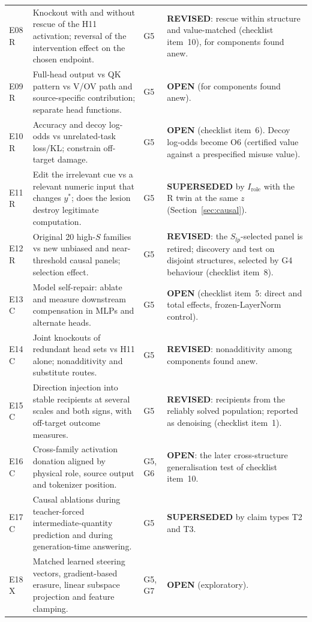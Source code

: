 \documentclass[10pt,a4paper]{article}
\begin{document}
\begin{longtable}{@{}P{1.2cm}P{7.2cm}P{1.3cm}P{5.6cm}@{}}
E08 \newline R & Knockout with and without rescue of the H11 activation; reversal of the intervention effect on the chosen endpoint. & G5 &
\textbf{REVISED}: rescue within structure and value-matched (checklist item~10), for components found anew. \\
E09 \newline R & Full-head output vs QK pattern vs V/OV path and source-specific contribution; separate head functions. & G5 &
\textbf{OPEN} (for components found anew). \\
E10 \newline R & Accuracy and decoy log-odds vs unrelated-task loss/KL; constrain off-target damage. & G5 &
\textbf{OPEN} (checklist item~6). Decoy log-odds become O6 (certified value against a prespecified misuse value). \\
E11 \newline R & Edit the irrelevant cue vs a relevant numeric input that changes $y^*$; does the lesion destroy legitimate computation. & G5 &
\textbf{SUPERSEDED} by $I_{\text{role}}$ with the R twin at the same $z$ (Section~\ref{sec:causal}). \\
E12 \newline R & Original 20 high-$S$ families vs new unbiased and near-threshold causal panels; selection effect. & G5 &
\textbf{REVISED}: the $S_{lp}$-selected panel is retired; discovery and test on disjoint structures, selected by G4 behaviour (checklist item~8). \\
E13 \newline C & Model self-repair: ablate and measure downstream compensation in MLPs and alternate heads. & G5 &
\textbf{OPEN} (checklist item~5: direct and total effects, frozen-LayerNorm control). \\
E14 \newline C & Joint knockouts of redundant head sets vs H11 alone; nonadditivity and substitute routes. & G5 &
\textbf{REVISED}: nonadditivity among components found anew. \\
E15 \newline C & Direction injection into stable recipients at several scales and both signs, with off-target outcome measures. & G5 &
\textbf{REVISED}: recipients from the reliably solved population; reported as denoising (checklist item~1). \\
E16 \newline C & Cross-family activation donation aligned by physical role, source output and tokenizer position. & G5, G6 &
\textbf{OPEN}: the later cross-structure generalisation test of checklist item~10. \\
E17 \newline C & Causal ablations during teacher-forced intermediate-quantity prediction and during generation-time answering. & G5 &
\textbf{SUPERSEDED} by claim types T2 and T3. \\
E18 \newline X & Matched learned steering vectors, gradient-based erasure, linear subspace projection and feature clamping. & G5, G7 &
\textbf{OPEN} (exploratory). \\
\end{longtable}
\end{document}
